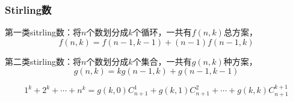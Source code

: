 \subsubsection{Stirling数}
第一类sitrling数：将$n$个数划分成$k$个循环，一共有$f(n,k)$总方案，$$f(n,k)=f(n-1,k-1)+(n-1)f(n-1,k)$$ 

第二类stirling数：将$n$个数划分成$k$个集合，一共有$g(n,k)$种方案，$$g(n,k)=kg(n-1,k)+g(n-1,k-1)$$ 

$$1^k+2^k+\cdots+n^k=g(k,0)C_{n+1}^1+g(k,1)C_{n+1}^2+\cdots +g(k,k)C_{n+1}^{k+1}$$
